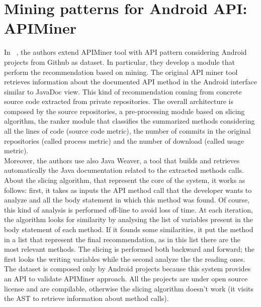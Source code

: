\section{Mining patterns for Android  API: APIMiner}
In  ~\cite{borges_mining_2015}, the authors extend APIMiner tool with API pattern considering Android projects from Github as dataset. In particular, they develop a module that perform the recommendation based on mining. The original API miner tool~\cite{montandon_documenting_2013}  retrieves information about the documented API method in the Android interface similar to JavaDoc view. This kind of recommendation coming from  concrete source code extracted from private repositories. The overall  architecture is composed by the source repositories, a pre-processing module based on slicing algorithm, the ranker module that classifies the summarized methods  considering all the lines of  code (source code metric), the number of commits in the original repositories (called process metric) and the number of download (called usage metric). \\
Moreover, the authors use also Java Weaver, a tool that builds and retrieves automatically the Java documentation related to the extracted methods calls. About the slicing algorithm, that represent the core of the system, it works as follows: first, it takes as inputs the API method call that the developer wants to analyze and all the body statement in which this method was found. Of course, this kind of analysis is performed off-line to avoid loss of time. At each iteration, the algorithm looks for similarity by analysing the list of variables present in the body statement of each method. If it founds some similarities, it put the method in a list that represent the final recommendation, as in this list there are the most relevant methods. The slicing is performed both backward and forward; the first looks the writing variables while the second analyze the the reading ones. The dataset is composed only by Android projects because this system provides an API to validate APIMiner approach. All the projects are under open source license and are compilable, otherwise the slicing algorithm doesn't work (it visits the AST to retrieve information about method calls). \\
